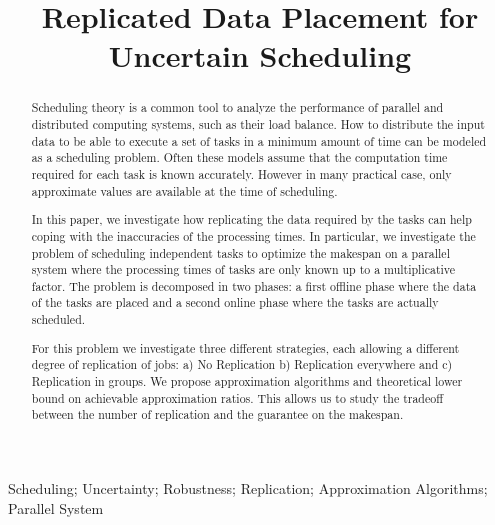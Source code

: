 \documentclass[10pt, conference, compsocconf]{IEEEtran}
\begin{document}
\title{Replicated Data Placement for Uncertain Scheduling}


\author{
}

\maketitle


\begin{abstract}
  Scheduling theory is a common tool to analyze the
  performance of parallel and distributed computing systems, such as their load
  balance. How to distribute the input data to be able to execute a
  set of tasks in a minimum amount of time can be modeled as a
  scheduling problem. Often these models assume that the computation
  time required for each task is known accurately. However in many
  practical case, only approximate values are available at the time of
  scheduling.

  In this paper, we investigate how replicating the data required by
  the tasks can help coping with the inaccuracies of the processing
  times. In particular, we investigate the problem of scheduling
  independent tasks to optimize the makespan on a parallel system
  where the processing times of tasks are only known up to a
  multiplicative factor. The problem is decomposed in two phases: a
  first offline phase where the data of the tasks are placed and a second
  online phase where the tasks are actually scheduled.

  For this problem we investigate three different strategies, each
  allowing a different degree of replication of jobs: a) No
  Replication b) Replication everywhere and c) Replication in
  groups. We propose approximation algorithms and theoretical lower
  bound on achievable approximation ratios.  This allows us to study
  the tradeoff between the number of replication and the guarantee on
  the makespan.
\end{abstract}

\begin{IEEEkeywords}
Scheduling; Uncertainty; Robustness; Replication; Approximation Algorithms; Parallel System

\end{IEEEkeywords}
\end{document}
